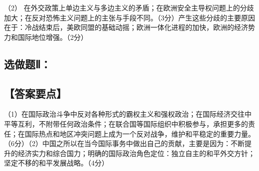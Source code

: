 \documentclass[UTF8,11pt]{ctexart}
\begin{document}
（2） 在外交政策上单边主义与多边主义的矛盾；在欧洲安全主导权问题上的分歧加大；在反对恐怖主义问题上的主张与手段不同。（3分）产生这些分歧的主要原因在于：冷战结束后，美欧同盟的基础动摇；欧洲一体化进程的加快，欧洲的经济势力和国际地位增强。（2分）


\subsection*{选做题Ⅱ：}

\subsection*{【答案要点】}

（1）在国际政治斗争中反对各种形式的霸权主义和强权政治；在国际经济交往中平等互利，不附带任何政治条件；在联合国等国际组织中积极参与，承担更多的责任；在国际热点和地区冲突问题上成为一个反对战争，维护和平稳定的重要力量。（6分）（2）中国之所以在当今国际事务中做出自己的贡献，主要是因为：不断提升的经济实力和综合国力；明确的国际政治角色定位：独立自主的和平外交方针；坚定不移的和平发展战略。（4分）
\end{document}
